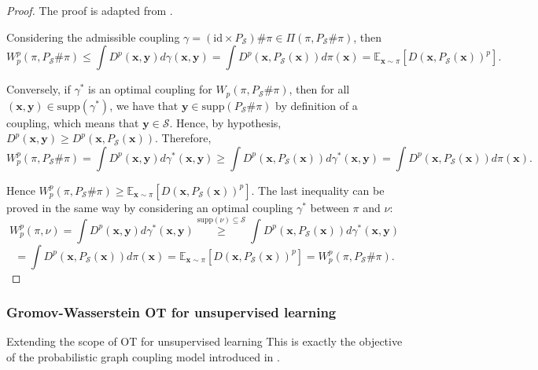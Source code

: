 \begin{proof}
    The proof is adapted from \citep{Canas12}.

    Considering the admissible coupling $\gamma = (\mathrm{id} \times P_{\mathcal{S}}) \# \pi \in \Pi(\pi, P_{\mathcal{S}} \# \pi)$, then
    \[
    W_p^p(\pi, P_{\mathcal{S}} \# \pi) \leq \int D^p(\mathbf{x}, \mathbf{y}) d\gamma(\mathbf{x}, \mathbf{y}) = \int D^p(\mathbf{x}, P_{\mathcal{S}}(\mathbf{x})) d\pi(\mathbf{x}) = \mathbb{E}_{\mathbf{x} \sim \pi} \left[ D(\mathbf{x}, P_{\mathcal{S}}(\mathbf{x}))^p \right].
    \tag{88}
    \]
    
    Conversely, if $\gamma^*$ is an optimal coupling for $W_p(\pi, P_{\mathcal{S}} \# \pi)$, then for all $(\mathbf{x}, \mathbf{y}) \in \mathrm{supp}(\gamma^*)$, we have that $\mathbf{y} \in \mathrm{supp}(P_{\mathcal{S}} \# \pi)$ by definition of a coupling, which means that $\mathbf{y} \in \mathcal{S}$. Hence, by hypothesis, $D^p(\mathbf{x}, \mathbf{y}) \geq D^p(\mathbf{x}, P_{\mathcal{S}}(\mathbf{x}))$. Therefore,
    \[
    W_p^p(\pi, P_{\mathcal{S}} \# \pi) = \int D^p(\mathbf{x}, \mathbf{y}) d\gamma^*(\mathbf{x}, \mathbf{y}) \geq \int D^p(\mathbf{x}, P_{\mathcal{S}}(\mathbf{x})) d\gamma^*(\mathbf{x}, \mathbf{y}) = \int D^p(\mathbf{x}, P_{\mathcal{S}}(\mathbf{x})) d\pi(\mathbf{x}).
    \tag{89}
    \]
    
    Hence $W_p^p(\pi, P_{\mathcal{S}} \# \pi) \geq \mathbb{E}_{\mathbf{x} \sim \pi} \left[ D(\mathbf{x}, P_{\mathcal{S}}(\mathbf{x}))^p \right]$. The last inequality can be proved in the same way by considering an optimal coupling $\gamma^*$ between $\pi$ and $\nu$:
    \[
    W_p^p(\pi, \nu) = \int D^p(\mathbf{x}, \mathbf{y}) d\gamma^*(\mathbf{x}, \mathbf{y}) \overset{\mathrm{supp}(\nu) \subseteq \mathcal{S}}{\geq} \int D^p(\mathbf{x}, P_{\mathcal{S}}(\mathbf{x})) d\gamma^*(\mathbf{x}, \mathbf{y})
    \]
    \[
    = \int D^p(\mathbf{x}, P_{\mathcal{S}}(\mathbf{x})) d\pi(\mathbf{x}) = \mathbb{E}_{\mathbf{x} \sim \pi} \left[ D(\mathbf{x}, P_{\mathcal{S}}(\mathbf{x}))^p \right] = W_p^p(\pi, P_{\mathcal{S}} \# \pi).
    \tag{90}
    \]
\end{proof}


\subsubsection{Gromov-Wasserstein OT for unsupervised learning}



\begin{prob}{Extending the scope of OT for unsupervised learning}\label{prob:ot_unsupervised}
    This is exactly the objective of the probabilistic graph coupling model introduced in .
\end{prob}
